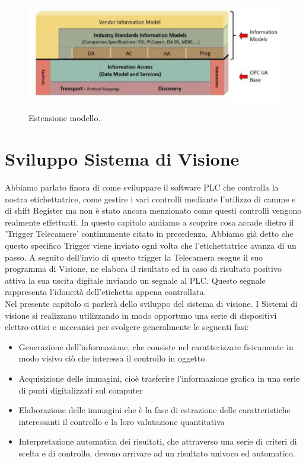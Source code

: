 \documentclass[12pt, a4paper, oneside]{book}
\begin{document}
\begin{itemize}
	\begin{figure}[H]
		\centering
		\includegraphics[width=13cm]{Immagini/OPC2}
		\label{OPC2}
		\caption{Estensione modello.}
	\end{figure}
\end{itemize}

\chapter{Sviluppo Sistema di Visione}
Abbiamo parlato finora di come sviluppare il software PLC che controlla la nostra etichettatrice, come gestire i vari controlli mediante l'utilizzo di camme e di shift Register ma non è stato ancora menzionato come questi controlli vengono realmente effettuati. In questo capitolo andiamo a scoprire cosa accade dietro il 'Trigger Telecamere' continumente citato in precedenza.
Abbiamo già detto che questo specifico Trigger viene inviato ogni volta che l'etichettatrice avanza di un passo. A seguito dell'invio di questo trigger la Telecamera esegue il suo programma di Visione, ne elabora il risultato ed in caso di risultato positivo attiva la sua uscita digitale inviando un segnale al PLC. Questo segnale rappresenta l'idoneità dell'etichetta appena controllata.
\\Nel presente capitolo si parlerà dello sviluppo del sistema di visione. I Sistemi di visione si realizzano utilizzando in modo opportuno una serie di dispositivi elettro-ottici e meccanici per svolgere generalmente le seguenti fasi:
\begin{itemize}
	\item Generazione dell'informazione, che consiste nel caratterizzare fisicamente in modo visivo ciò che interessa il controllo in oggetto
	\item Acquisizione delle immagini, cioè trasferire l'informazione grafica in una serie di punti digitalizzati sul computer
	\item Elaborazione delle immagini che è la fase di estrazione delle caratteristiche interessanti il controllo e la loro valutazione quantitativa
	\item Interpretazione automatica dei risultati, che attraverso una serie di criteri di scelta e di controllo, devono arrivare ad un risultato univoco ed automatico.
\end{itemize} 
\end{document}
